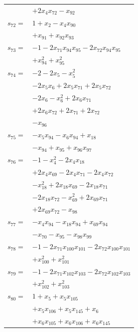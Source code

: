 \begin{longtable}{@{}r@{\;}l@{}}
 & \(\displaystyle +2x_{4}x_{72} -x_{92}\) \\[3pt]
\(s_{72}=\) & \(\displaystyle 1 +x_{2} -x_{4}x_{90}\) \\
 & \(\displaystyle +x_{91} +x_{92}x_{93}\) \\[3pt]
\(s_{73}=\) & \(\displaystyle -1 -2x_{71}x_{94}x_{95} -2x_{72}x_{94}x_{95}\) \\
 & \(\displaystyle +x_{94}^{2} +x_{95}^{2}\) \\[3pt]
\(s_{74}=\) & \(\displaystyle -2 -2x_{5} -x_{5}^{2}\) \\
 & \(\displaystyle -2x_{5}x_{6} +2x_{5}x_{71} +2x_{5}x_{72}\) \\
 & \(\displaystyle -2x_{6} -x_{6}^{2} +2x_{6}x_{71}\) \\
 & \(\displaystyle +2x_{6}x_{72} +2x_{71} +2x_{72}\) \\
 & \(\displaystyle -x_{96}\) \\[3pt]
\(s_{75}=\) & \(\displaystyle -x_{5}x_{94} -x_{6}x_{94} +x_{18}\) \\
 & \(\displaystyle -x_{94} +x_{95} +x_{96}x_{97}\) \\[3pt]
\(s_{76}=\) & \(\displaystyle -1 -x_{4}^{2} -2x_{4}x_{18}\) \\
 & \(\displaystyle +2x_{4}x_{69} -2x_{4}x_{71} -2x_{4}x_{72}\) \\
 & \(\displaystyle -x_{18}^{2} +2x_{18}x_{69} -2x_{18}x_{71}\) \\
 & \(\displaystyle -2x_{18}x_{72} -x_{69}^{2} +2x_{69}x_{71}\) \\
 & \(\displaystyle +2x_{69}x_{72} -x_{98}\) \\[3pt]
\(s_{77}=\) & \(\displaystyle -x_{4}x_{94} -x_{18}x_{94} +x_{69}x_{94}\) \\
 & \(\displaystyle -x_{70} -x_{95} -x_{98}x_{99}\) \\[3pt]
\(s_{78}=\) & \(\displaystyle -1 -2x_{71}x_{100}x_{101} -2x_{72}x_{100}x_{101}\) \\
 & \(\displaystyle +x_{100}^{2} +x_{101}^{2}\) \\[3pt]
\(s_{79}=\) & \(\displaystyle -1 -2x_{71}x_{102}x_{103} -2x_{72}x_{102}x_{103}\) \\
 & \(\displaystyle +x_{102}^{2} +x_{103}^{2}\) \\[3pt]
\(s_{80}=\) & \(\displaystyle 1 +x_{5} +x_{5}x_{105}\) \\
 & \(\displaystyle +x_{5}x_{106} +x_{5}x_{145} +x_{6}\) \\
 & \(\displaystyle +x_{6}x_{105} +x_{6}x_{106} +x_{6}x_{145}\) \\

\end{longtable}
